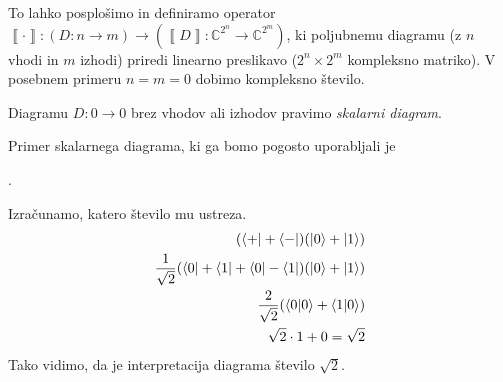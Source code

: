 \documentclass[mat1]{fmfdelo}
\newcommand{\C}{\mathbb C}
\newcommand{\interpret}[1]{\left\llbracket #1 \right\rrbracket}
\begin{document}
To lahko posplošimo in definiramo operator \(\interpret{\cdot}: (D:n\to m)\to (\interpret{D}: \C^{2^n} \to \C^{2^m})\), ki poljubnemu diagramu (z \(n\) vhodi in \(m\) izhodi) priredi linearno preslikavo (\(2^n\times 2^m\) kompleksno matriko). V posebnem primeru \(n=m=0\) dobimo kompleksno število.
\begin{definicija}
    Diagramu \(D:0\to0\) brez vhodov ali izhodov pravimo \emph{skalarni diagram}.
\end{definicija}
\begin{primer}\label{skal}
    Primer skalarnega diagrama, ki ga bomo pogosto uporabljali je 
\begin{center}
    .
\end{center}
Izračunamo, katero število mu ustreza.
\begin{align*}
    (\bra{+}+\bra{-})(\ket0 + \ket 1)\\
    \frac{1}{\sqrt2}(\bra{0}+\bra{1}+\bra0-\bra1)(\ket0 + \ket 1)\\
    \frac{2}{\sqrt2}(\braket{0}{0}+\braket{1}{0})\\
    \sqrt{2}\cdot 1 + 0 = \sqrt2
\end{align*}
Tako vidimo, da je interpretacija diagrama število \(\sqrt{2}\).
\end{primer}
\end{document}
